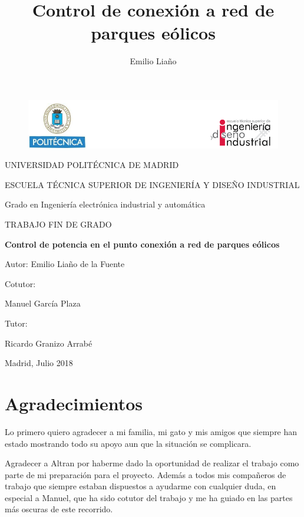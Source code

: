 \documentclass{book}
\title{Control de conexi\'on a red de parques e\'olicos}
\date{}
\author{Emilio Lia\~no}
\begin{document}
\begin{figure}[h!]
\centering
\includegraphics[width=\textwidth]{Encabezado.PNG}
\end{figure}
\begin{center}
	\LARGE
	UNIVERSIDAD POLIT\'ECNICA DE MADRID \par
	\vspace {10 mm}
	ESCUELA T\'ECNICA SUPERIOR DE INGENIER\'IA Y DISEÑO INDUSTRIAL\par
	\vspace {10 mm}
	\LARGE
	Grado en Ingenier\'ia electr\'onica industrial y autom\'atica \par
	\vspace {10 mm}
	\Huge
	TRABAJO FIN DE GRADO \par
	\vspace{20 mm}
	\LARGE
	\textbf{Control de potencia en el punto conexi\'on a red de parques e\'olicos}\par
	\vspace {10 mm}
	Autor: Emilio Liaño de la Fuente \par
	\vspace {10 mm}
\end{center}
\begin{multicols}{2}
	\LARGE
	Cotutor:

	Manuel Garc\'ia Plaza \par
	Tutor:

	Ricardo Granizo Arrab\'e
\vfill
		
\end{multicols}

\begin{flushright}
\vfill
	Madrid, Julio 2018
\end{flushright}
\afterpage{\null\newpage}
\newpage
\normalsize
{}

\chapter*{Agradecimientos}

Lo primero quiero agradecer a mi familia, mi gato y mis amigos que siempre han estado mostrando todo su apoyo aun que la situaci\'on se complicara. 

Agradecer a Altran por haberme dado la oportunidad de realizar el trabajo como parte de mi preparaci\'on para el proyecto. Adem\'as a todos mis compañeros de trabajo que siempre estaban dispuestos a ayudarme con cualquier duda, en especial a Manuel, que ha sido cotutor del trabajo y me ha guiado en las partes m\'as oscuras de este recorrido.
\end{document}
